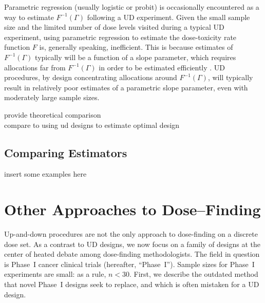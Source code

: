 Parametric regression (usually logistic or probit) is occasionally encountered as a way to estimate $F^{-1}(\Gamma)$ following a UD experiment. Given the small sample size and the limited number of dose levels visited during a typical UD experiment, using parametric regression to estimate the dose-toxicity rate function $F$ is, generally speaking, inefficient.  This is because estimates of $F^{-1}(\Gamma)$ typically will be a function of a slope parameter, which requires allocations far from $F^{-1}(\Gamma)$ in order to be estimated efficiently \citep{Ford:Tors:Wu:use:1992}.  UD procedures, by design concentrating allocations around $F^{-1}(\Gamma)$, will typically result in relatively poor estimates  of a parametric slope parameter, even with moderately large sample sizes.

provide theoretical comparison\\
compare to using ud designs to estimate optimal design

\section{Comparing Estimators}
insert some examples here

\chapter{Other Approaches to Dose--Finding}\label{sec:other}

Up-and-down procedures are not the only approach to dose-finding on a discrete dose set. As a contrast to UD designs, we now focus on a family of designs at the center of heated debate among dose-finding methodologists. The field in question is Phase~I cancer clinical trials (hereafter, ``Phase~I''). Sample sizes for Phase~I experiments are small: as a rule, $n<30$. First, we describe the outdated method that novel Phase~I designs seek to replace, and which is often \citep{Rogat:etal:oped:2007,Zack:stag:2009} mistaken for a UD design.


